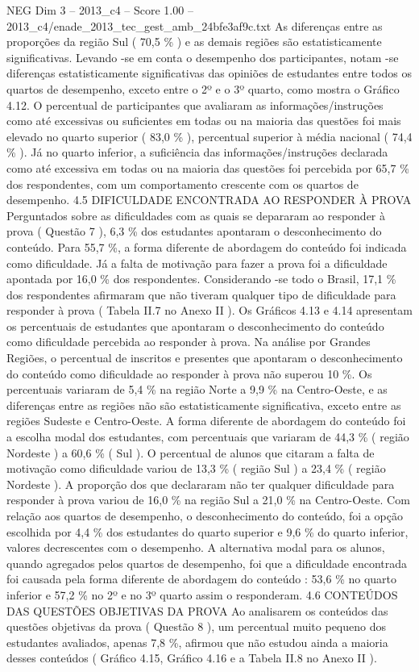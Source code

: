 \begin{textsample}{NEG Dim 3 – 2013\_c4 – Score 1.00 – 2013\_c4/enade\_2013\_tec\_gest\_amb\_24bfe3af9c.txt}
As diferenças entre as proporções da região Sul ( 70,5 \% ) e as demais regiões são estatisticamente significativas.
Levando -se em conta o desempenho dos participantes, notam -se diferenças estatisticamente significativas das opiniões de estudantes entre todos os quartos de desempenho, exceto entre o 2º e o 3º quarto, como mostra o Gráfico 4.12.
O percentual de participantes que avaliaram as informações/instruções como até excessivas ou suficientes em todas ou na maioria das questões foi mais elevado no quarto superior ( 83,0 \% ), percentual superior à média nacional ( 74,4 \% ).
Já no quarto inferior, a suficiência das informações/instruções declarada como até excessiva em todas ou na maioria das questões foi percebida por 65,7 \% dos respondentes, com um comportamento crescente com os quartos de desempenho. 4.5 DIFICULDADE ENCONTRADA AO RESPONDER À PROVA Perguntados sobre as dificuldades com as quais se depararam ao responder à prova ( Questão 7 ), 6,3 \% dos estudantes apontaram o desconhecimento do conteúdo.
Para 55,7 \%, a forma diferente de abordagem do conteúdo foi indicada como dificuldade.
Já a falta de motivação para fazer a prova foi a dificuldade apontada por 16,0 \% dos respondentes.
Considerando -se todo o Brasil, 17,1 \% dos respondentes afirmaram que não tiveram qualquer tipo de dificuldade para responder à prova ( Tabela II.7 no Anexo II ).
Os Gráficos 4.13 e 4.14 apresentam os percentuais de estudantes que apontaram o desconhecimento do conteúdo como dificuldade percebida ao responder à prova.
Na análise por Grandes Regiões, o percentual de inscritos e presentes que apontaram o desconhecimento do conteúdo como dificuldade ao responder à prova não superou 10 \%.
Os percentuais variaram de 5,4 \% na região Norte a 9,9 \% na Centro-Oeste, e as diferenças entre as regiões não são estatisticamente significativa, exceto entre as regiões Sudeste e Centro-Oeste.
A forma diferente de abordagem do conteúdo foi a escolha modal dos estudantes, com percentuais que variaram de 44,3 \% ( região Nordeste ) a 60,6 \% ( Sul ).
O percentual de alunos que citaram a falta de motivação como dificuldade variou de 13,3 \% ( região Sul ) a 23,4 \% ( região Nordeste ).
A proporção dos que declararam não ter qualquer dificuldade para responder à prova variou de 16,0 \% na região Sul a 21,0 \% na Centro-Oeste.
Com relação aos quartos de desempenho, o desconhecimento do conteúdo, foi a opção escolhida por 4,4 \% dos estudantes do quarto superior e 9,6 \% do quarto inferior, valores decrescentes com o desempenho.
A alternativa modal para os alunos, quando agregados pelos quartos de desempenho, foi que a dificuldade encontrada foi causada pela forma diferente de abordagem do conteúdo : 53,6 \% no quarto inferior e 57,2 \% no 2º e no 3º quarto assim o responderam. 4.6 CONTEÚDOS DAS QUESTÕES OBJETIVAS DA PROVA Ao analisarem os conteúdos das questões objetivas da prova ( Questão 8 ), um percentual muito pequeno dos estudantes avaliados, apenas 7,8 \%, afirmou que não estudou ainda a maioria desses conteúdos ( Gráfico 4.15, Gráfico 4.16 e a Tabela II.8 no Anexo II ).

\end{textsample}
